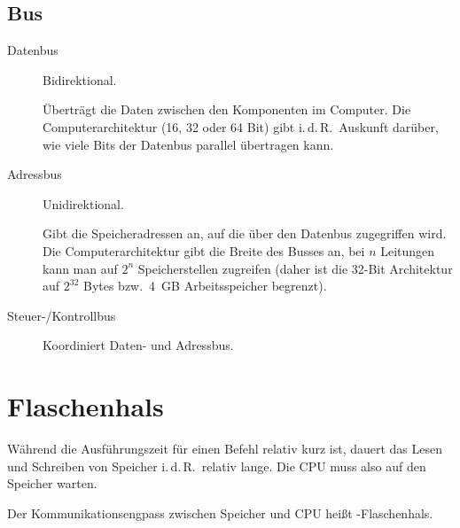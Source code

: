 \subsection{Bus}
\begin{description}
  \item [{Datenbus}] 
	Bidirektional.

	Überträgt die Daten zwischen den Komponenten im Computer.
	Die Computerarchitektur (16, 32 oder 64 Bit) gibt i.\,d.\,R.~Auskunft darüber, wie viele Bits der Datenbus parallel übertragen kann.

  \item [{Adressbus}] 
	Unidirektional.

	Gibt die Speicheradressen an, auf die über den Datenbus zugegriffen wird.
	Die Computerarchitektur gibt die Breite des Busses an, bei $n$ Leitungen kann man auf $2^n$ Speicherstellen zugreifen (daher ist die 32-Bit Architektur auf $2^{32}$ Bytes bzw.~4~GB Arbeitsspeicher begrenzt).

  \item [{Steuer-/Kontrollbus}] 
	Koordiniert Daten- und Adressbus.
\end{description}

\section{\label{sec:Flaschenhals}Flaschenhals}

Während die Ausführungszeit für einen Befehl relativ kurz ist, dauert das Lesen und Schreiben von Speicher i.\,d.\,R.~relativ lange.
Die CPU muss also auf den Speicher warten.

Der Kommunikationsengpass zwischen Speicher und CPU heißt -Flasch\-en\-hals.


